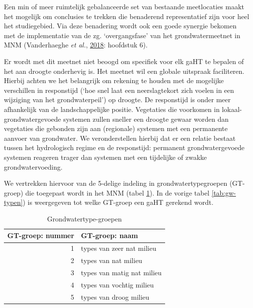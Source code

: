 \documentclass[11pt,]{book}
\begin{document}
Een min of meer ruimtelijk gebalanceerde set van bestaande meetlocaties
maakt het mogelijk om conclusies te trekken die benaderend
representatief zijn voor heel het studiegebied. Via deze benadering
wordt ook een goede synergie bekomen met de implementatie van de zg.
`overgangsfase' van het grondwatermeetnet in MNM (Vanderhaeghe \emph{et
al.}, \protect\hyperlink{ref-vanderhaeghe_meetnetten_2018}{2018}:
hoofdstuk 6).

Er wordt met dit meetnet niet beoogd om specifiek voor elk gaHT te
bepalen of het aan droogte onderhevig is. Het meetnet wil een globale
uitspraak faciliteren. Hierbij achten we het belangrijk om rekening te
houden met de mogelijke verschillen in responstijd (`hoe snel laat een
neerslagtekort zich voelen in een wijziging van het grondwaterpeil') op
droogte. De responstijd is onder meer afhankelijk van de
landschappelijke positie. Vegetaties die voorkomen in
lokaal-grondwatergevoede systemen zullen sneller een droogte gewaar
worden dan vegetaties die gebonden zijn aan (regionale) systemen met een
permanente aanvoer van grondwater. We veronderstellen hierbij dat er een
relatie bestaat tussen het hydrologisch regime en de responstijd:
permanent grondwatergevoede systemen reageren trager dan systemen met
een tijdelijke of zwakke grondwatervoeding.

We vertrekken hiervoor van de 5-delige indeling in grondwatertypegroepen
(GT-groep) die toegepast wordt in het MNM (tabel \ref{tab:GTgroepen}).
In de vorige tabel \ref{tab:gw-typen}) is weergegeven tot welke GT-groep
een gaHT gerekend wordt.

\begin{table}

\caption{\label{tab:GTgroepen}Grondwatertype-groepen}
\centering
\begin{tabular}[t]{r|l}
\hline
GT-groep: nummer & GT-groep: naam\\
\hline
1 & types van zeer nat milieu\\
\hline
2 & types van nat milieu\\
\hline
3 & types van matig nat milieu\\
\hline
4 & types van vochtig milieu\\
\hline
5 & types van droog milieu\\
\hline
\end{tabular}
\end{table}
\end{document}

